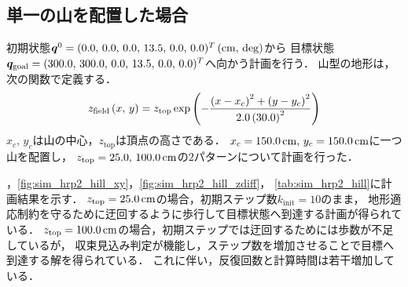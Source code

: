 \documentclass[autodetect-engine,dvipdfmx-if-dvi,ja=standard,a4j,jbase=11pt,magstyle=nomag*]{bxjsreport}
\begin{document}
\subsection{単一の山を配置した場合}
初期状態$\bm{q}^0 = ( 0.0 ,\, 0.0 ,\, 0.0 ,\, 13.5 ,\, 0.0 ,\, 0.0 )^T\,(\si{\centi\meter} ,\, \mathrm{deg})$から
目標状態$\bm{q}_{\mathrm{goal}} = ( 300.0 ,\, 300.0 ,\, 0.0 ,\, 13.5 ,\, 0.0 ,\, 0.0 )^T$へ向かう計画を行う．
山型の地形は，次の関数で定義する．
\begin{equation}
    z_{\mathrm{field}}\left( x ,\, y \right) = z_{\mathrm{top}} \exp \left( - \frac{ \left( x - x_c \right)^2 + \left( y - y_c \right)^2}{2.0 \left( 30.0 \right)^2} \right)
\end{equation}
$x_c ,\, y_c$は山の中心，$z_{\mathrm{top}}$は頂点の高さである．
$x_c = 150.0\,\si{\centi\meter},\, y_c = 150.0\,\si{\centi\meter}$に一つ山を配置し，
$z_{\mathrm{top}} = 25.0 ,\, 100.0\,\si{\centi\meter}$の$2$パターンについて計画を行った．

，\cref{fig:sim_hrp2_hill_xy}，\cref{fig:sim_hrp2_hill_zdiff}，
\cref{tab:sim_hrp2_hill}に計画結果を示す．
$z_{\mathrm{top}} = 25.0\,\si{\centi\meter}$の場合，初期ステップ数$k_\mathrm{init} = 10$のまま，
地形適応制約を守るために迂回するように歩行して目標状態へ到達する計画が得られている．
$z_{\mathrm{top}} = 100.0\,\si{\centi\meter}$の場合，初期ステップでは迂回するためには歩数が不足しているが，
収束見込み判定が機能し，ステップ数を増加させることで目標へ到達する解を得られている．
これに伴い，反復回数と計算時間は若干増加している．
\end{document}
